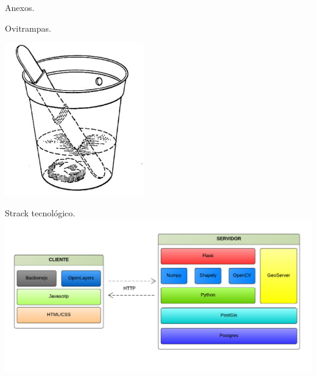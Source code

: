 \begin{frame}[c,plain]{}
    \begin{center}
    Anexos.
    \end{center}
\end{frame}

\begin{frame}[c]{Ovitrampas.}
  \begin{center}
    \includegraphics[width=6cm]{../book/capitulo-3/graphics/ovitrampa.jpg}
  \end{center}
\end{frame}

\begin{frame}[c]{Strack tecnológico.}
\includegraphics[width=\textwidth]{../book/capitulo-5/graphics/stack-tecnologias.png}
\end{frame}


